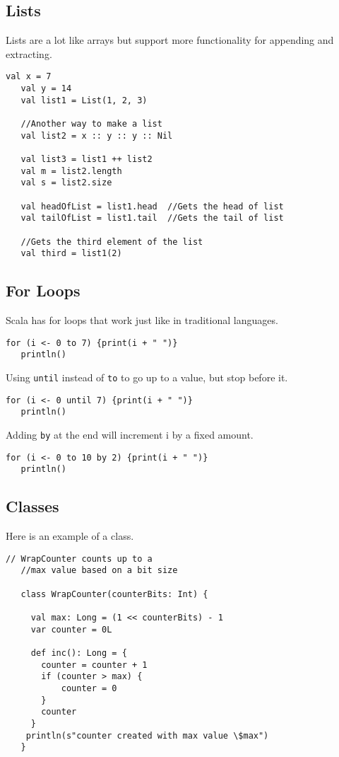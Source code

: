 \documentclass[12pt, letterpaper]{report}
\begin{document}
\subsection{Lists}
Lists are a lot like arrays but support more functionality for appending and extracting.

\begin{lstlisting}[style=scala]
   val x = 7
   val y = 14
   val list1 = List(1, 2, 3)
   
   //Another way to make a list
   val list2 = x :: y :: y :: Nil	

   val list3 = list1 ++ list2
   val m = list2.length
   val s = list2.size

   val headOfList = list1.head	//Gets the head of list
   val tailOfList = list1.tail	//Gets the tail of list

   //Gets the third element of the list
   val third = list1(2)			
\end{lstlisting}

\subsection{For Loops}
Scala has for loops that work just like in traditional languages.

\begin{lstlisting}[style=scala]
   for (i <- 0 to 7) {print(i + " ")}
   println()
\end{lstlisting}

Using \verb|until| instead of \verb|to| to go up to a value, but stop before it.
 
\begin{lstlisting}[style=scala]
   for (i <- 0 until 7) {print(i + " ")}
   println()
\end{lstlisting}

Adding \verb|by| at the end will increment i by a fixed amount.

\begin{lstlisting}[style=scala]
   for (i <- 0 to 10 by 2) {print(i + " ")}
   println()
\end{lstlisting}

\subsection{Classes}
Here is an example of a class.

\begin{lstlisting}[style=scala]
   // WrapCounter counts up to a 
   //max value based on a bit size

   class WrapCounter(counterBits: Int) {

     val max: Long = (1 << counterBits) - 1
     var counter = 0L
    
     def inc(): Long = {
       counter = counter + 1
       if (counter > max) {
           counter = 0
       }
       counter
     }
    println(s"counter created with max value \$max")
   }
\end{lstlisting}
\end{document}
